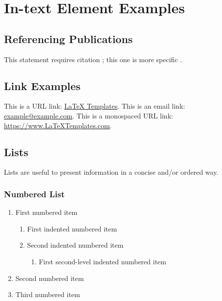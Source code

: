 \documentclass[
	11pt, %
	fleqn, %
	a4paper, %
	oneside, %
]{LegrandOrangeBook}
\begin{document}

\chapter{In-text Element Examples}

\section{Referencing Publications}

This statement requires citation \cite{Smith:2022jd}; this one is more specific \cite[162]{Smith:2021qr}.


\section{Link Examples}

This is a URL link: \href{https://www.latextemplates.com}{LaTeX Templates}. This is an email link: \href{mailto:example@example.com}{example@example.com}. This is a monospaced URL link: \url{https://www.LaTeXTemplates.com}.


\section{Lists}

Lists are useful to present information in a concise and/or ordered way.

\subsection{Numbered List}

\begin{enumerate}
	\item First numbered item
	\begin{enumerate}
		\item First indented numbered item
		\item Second indented numbered item
		\begin{enumerate}
			\item First second-level indented numbered item
		\end{enumerate}
	\end{enumerate}
	\item Second numbered item
	\item Third numbered item
\end{enumerate}
\end{document}
